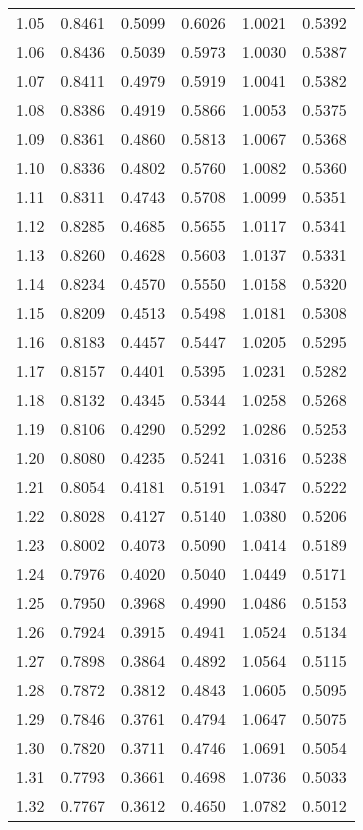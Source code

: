 \documentclass{article}
\begin{document}
\begin{longtable}{cccccc}
1.05 & 0.8461 & 0.5099 & 0.6026 & 1.0021 & 0.5392 \\
1.06 & 0.8436 & 0.5039 & 0.5973 & 1.0030 & 0.5387 \\
1.07 & 0.8411 & 0.4979 & 0.5919 & 1.0041 & 0.5382 \\
1.08 & 0.8386 & 0.4919 & 0.5866 & 1.0053 & 0.5375 \\
1.09 & 0.8361 & 0.4860 & 0.5813 & 1.0067 & 0.5368 \\
1.10 & 0.8336 & 0.4802 & 0.5760 & 1.0082 & 0.5360 \\
1.11 & 0.8311 & 0.4743 & 0.5708 & 1.0099 & 0.5351 \\
1.12 & 0.8285 & 0.4685 & 0.5655 & 1.0117 & 0.5341 \\
1.13 & 0.8260 & 0.4628 & 0.5603 & 1.0137 & 0.5331 \\
1.14 & 0.8234 & 0.4570 & 0.5550 & 1.0158 & 0.5320 \\
1.15 & 0.8209 & 0.4513 & 0.5498 & 1.0181 & 0.5308 \\
1.16 & 0.8183 & 0.4457 & 0.5447 & 1.0205 & 0.5295 \\
1.17 & 0.8157 & 0.4401 & 0.5395 & 1.0231 & 0.5282 \\
1.18 & 0.8132 & 0.4345 & 0.5344 & 1.0258 & 0.5268 \\
1.19 & 0.8106 & 0.4290 & 0.5292 & 1.0286 & 0.5253 \\
1.20 & 0.8080 & 0.4235 & 0.5241 & 1.0316 & 0.5238 \\
1.21 & 0.8054 & 0.4181 & 0.5191 & 1.0347 & 0.5222 \\
1.22 & 0.8028 & 0.4127 & 0.5140 & 1.0380 & 0.5206 \\
1.23 & 0.8002 & 0.4073 & 0.5090 & 1.0414 & 0.5189 \\
1.24 & 0.7976 & 0.4020 & 0.5040 & 1.0449 & 0.5171 \\
1.25 & 0.7950 & 0.3968 & 0.4990 & 1.0486 & 0.5153 \\
1.26 & 0.7924 & 0.3915 & 0.4941 & 1.0524 & 0.5134 \\
1.27 & 0.7898 & 0.3864 & 0.4892 & 1.0564 & 0.5115 \\
1.28 & 0.7872 & 0.3812 & 0.4843 & 1.0605 & 0.5095 \\
1.29 & 0.7846 & 0.3761 & 0.4794 & 1.0647 & 0.5075 \\
1.30 & 0.7820 & 0.3711 & 0.4746 & 1.0691 & 0.5054 \\
1.31 & 0.7793 & 0.3661 & 0.4698 & 1.0736 & 0.5033 \\
1.32 & 0.7767 & 0.3612 & 0.4650 & 1.0782 & 0.5012 \\

\end{longtable}
\end{document}
